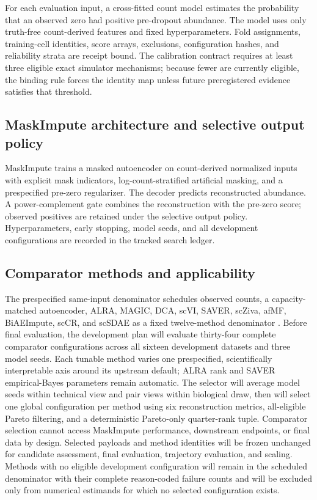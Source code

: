 \documentclass[pdflatex,sn-vancouver-num,referee,lineno]{sn-jnl}
\begin{document}
For each evaluation input, a cross-fitted count model estimates the probability that an observed zero had positive pre-dropout abundance. The model uses only truth-free count-derived features and fixed hyperparameters. Fold assignments, training-cell identities, score arrays, exclusions, configuration hashes, and reliability strata are receipt bound. The calibration contract requires at least three eligible exact simulator mechanisms; because fewer are currently eligible, the binding rule forces the identity map unless future preregistered evidence satisfies that threshold.

\subsection{MaskImpute architecture and selective output policy}

MaskImpute trains a masked autoencoder on count-derived normalized inputs with explicit mask indicators, log-count-stratified artificial masking, and a prespecified pre-zero regularizer. The decoder predicts reconstructed abundance. A power-complement gate combines the reconstruction with the pre-zero score; observed positives are retained under the selective output policy. Hyperparameters, early stopping, model seeds, and all development configurations are recorded in the tracked search ledger.

\subsection{Comparator methods and applicability}

The prespecified same-input denominator schedules observed counts, a capacity-matched autoencoder, ALRA, MAGIC, DCA, scVI, SAVER, scZiva, afMF, BiAEImpute, scCR, and scSDAE as a fixed twelve-method denominator \cite{Linderman2022ALRA,vanDijk2018MAGIC,Eraslan2019DCA,Lopez2018scVI,Huang2018SAVER,Vo2026scZiva,Huang2025afMF,Zhang2025BiAEImpute,Um2024scCR,Chi2020scSDAE}.
Before final evaluation, the development plan will evaluate thirty-four complete comparator configurations across all sixteen development datasets and three model seeds. Each tunable method varies one prespecified, scientifically interpretable axis around its upstream default; ALRA rank and SAVER empirical-Bayes parameters remain automatic. The selector will average model seeds within technical view and pair views within biological draw, then will select one global configuration per method using six reconstruction metrics, all-eligible Pareto filtering, and a deterministic Pareto-only quarter-rank tuple. Comparator selection cannot access MaskImpute performance, downstream endpoints, or final data by design. Selected payloads and method identities will be frozen unchanged for candidate assessment, final evaluation, trajectory evaluation, and scaling. Methods with no eligible development configuration will remain in the scheduled denominator with their complete reason-coded failure counts and will be excluded only from numerical estimands for which no selected configuration exists.
\end{document}
